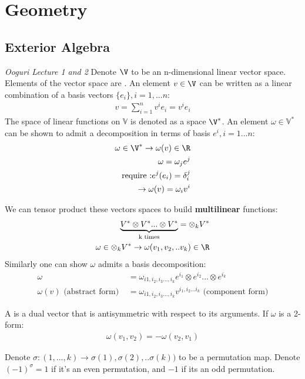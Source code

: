 \documentclass[11pt]{scrartcl}
\begin{document}
\section{Geometry}
\subsection{Exterior Algebra}
\emph{Ooguri Lecture 1 and 2}
Denote $\V$ to be an n-dimensional linear vector space.  Elements of the vector space are . An element $v \in \V$ can be written as a linear combination of a basis vectors $\{ e_i \}, i = 1, ... n$:
\begin{align}
	v = \sum_{i=1}^{n} v^i e_i = v^i e_i
\end{align}
The space of linear functions on $\mathbb{V}$ is denoted as a  space $\V^*$.  An element $\omega \in \mathbb{V}^*$ can be shown to admit a decomposition in terms of basis  ${e^i}, i = 1...n$:
\begin{align}
	\omega \in \V^* \rightarrow \omega(v) \in \R \\
	\omega = \omega_j e^j \\
	\text{ require :} e^j(e_i) = \delta^{j}_i \\
	\rightarrow \omega(v) = \omega_i v^i 
\end{align}

We can tensor product these vectors spaces to build \textbf{multilinear} functions:
\begin{align}
	\underbrace{V^* \otimes V^* ... \otimes V^*}_{\text{k times}} = \otimes_k V^* \\
	\omega \in \otimes_k V^* \rightarrow \omega(v_1, v_2, .. v_k) \in \R
\end{align}
Similarly one can show $\omega$ admits a basis decomposition:
\begin{align}
	\omega &= \omega_{i1 , i_2, i_3 ..., i_k} e^{i_1} \otimes e^{i_2}... \otimes e^{i_k} \\
	\omega(v) \text{ (abstract form) } &= \omega_{i1 , i_2, i_3 ..., i_k} v^{i_1, i_2 ... i_k} \text{ (component form)}
\end{align}

A  is a dual vector that is antisymmetric with respect to its arguments.  If $\omega$ is a 2-form:
\begin{align}
	\omega(v_1, v_2) = -\omega(v_2, v_1)
\end{align}

\begin{definition} Denote $\sigma: (1, ..., k) \rightarrow \sigma(1), \sigma(2), .. \sigma(k))$ to be a permutation map.  Denote $(-1)^\sigma = 1$ if it's an even permutation, and $-1$ if its an odd permutation.
\end{definition}
\end{document}
